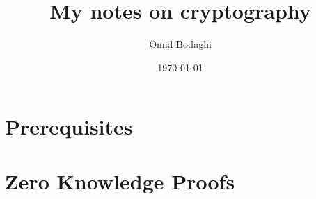 \documentclass[11pt, a4paper]{book}
\begin{document}
\frontmatter
\title{My notes on cryptography}
\author{Omid Bodaghi}
\date{\today}
\maketitle
\tableofcontents

\mainmatter
\part{Prerequisites}

\part{Zero Knowledge Proofs}

% 

\backmatter
\end{document}
